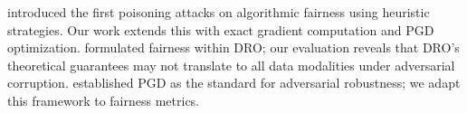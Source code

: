 \citet{solans2021poisoning} introduced the first poisoning attacks on algorithmic fairness using heuristic strategies. Our work extends this with exact gradient computation and PGD optimization. \citet{hashimoto2018fairness} formulated fairness within DRO; our evaluation reveals that DRO's theoretical guarantees may not translate to all data modalities under adversarial corruption. \citet{madry2018towards} established PGD as the standard for adversarial robustness; we adapt this framework to fairness metrics.
